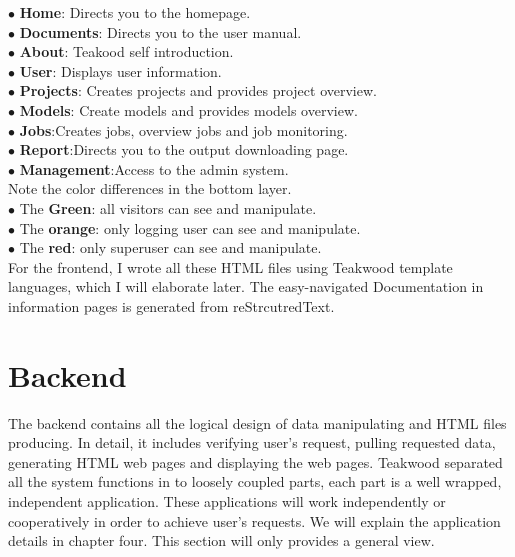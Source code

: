 $\bullet$ \textbf{Home}: Directs you to the homepage.\\
$\bullet$ \textbf{Documents}: Directs you to the user manual.\\
$\bullet$ \textbf{About}: Teakood self introduction.\\
$\bullet$ \textbf{User}: Displays user information.\\
$\bullet$ \textbf{Projects}: Creates projects and provides project overview.\\
$\bullet$ \textbf{Models}: Create models and provides models overview.\\
$\bullet$ \textbf{Jobs}:Creates jobs, overview jobs and job monitoring.\\
$\bullet$ \textbf{Report}:Directs you to the output downloading page.\\
$\bullet$ \textbf{Management}:Access to the admin system.\\


Note the color differences in the bottom layer.\\

$\bullet$ The \textbf{Green}: all visitors can see and manipulate.\\
$\bullet$ The \textbf{orange}: only logging user can see and manipulate.\\
$\bullet$ The \textbf{red}: only superuser can see and manipulate.\\

For the frontend, I wrote all these HTML files using Teakwood template languages, which I will elaborate later. The easy-navigated Documentation in information pages is generated from reStrcutredText.

\section{Backend}
The backend contains all the logical design of data manipulating and HTML files producing. In detail, it includes verifying user's request, pulling requested data, generating HTML web pages and displaying the web pages. Teakwood separated all the system functions in to loosely coupled parts, each part is a well wrapped, independent application. These applications will work independently or cooperatively in order to achieve user's requests. We will explain the application details in chapter four. This section will only  provides a general view.\\

